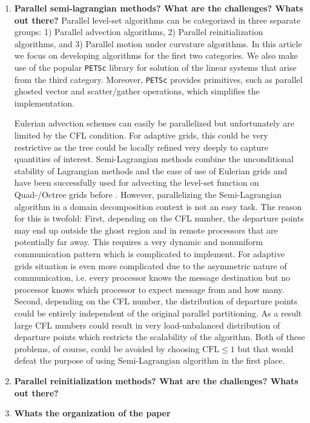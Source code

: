 \begin{enumerate}
\item \textbf{Parallel semi-lagrangian methods? What are the challenges? Whats out there?}
Parallel level-set algorithms can be categorized in three separate groups: 1) Parallel advection algorithms, 2) Parallel reinitialization algorithms, and 3) Parallel motion under curvature algorithms. In this article we focus on developing algorithms for the first two categories. We also make use of the popular \texttt{PETSc}  library for solution of the linear systems that arise from the third category. Moreover, \texttt{PETSc} provides primitives, such as parallel ghosted vector and scatter/gather operations, which simplifies the implementation. 

Eulerian advection schemes can easily be parallelized but unfortunately are limited by the CFL condition. For adaptive grids, this could be very restrictive as the tree could be locally refined very deeply to capture quantities of interest. Semi-Lagrangian methods combine the unconditional stability of Lagrangian methods and the ease of use of Eulerian grids and have been successfully used for advecting the level-set function on Quad-/Octree grids before . However, parallelizing the Semi-Lagrangian algorithm in a domain decomposition context is not an easy task. The reason for this is twofold: First, depending on the CFL number, the departure points may end up outside the ghost region and in remote processors that are potentially far away. This requires a very dynamic and nonuniform communication pattern which is complicated to implement. For adaptive grids situation is even more complicated due to the asymmetric nature of communication, i.e. every processor knows the message destination but no processor knows which processor to expect message from and how many. Second, depending on the CFL number, the distribution of departure points could be entirely independent of the original parallel partitioning. As a result large CFL numbers could result in very load-unbalanced distribution of departure points which restricts the scalability of the algorithm. Both of these problems, of course, could be avoided by choosing $\text{CFL} \le 1$ but that would defeat the purpose of using Semi-Lagrangian algorithm in the first place. 

\item \textbf{Parallel reinitialization methods? What are the challenges? Whats out there?}

\item \textbf{Whats the organization of the paper}
\end{enumerate}